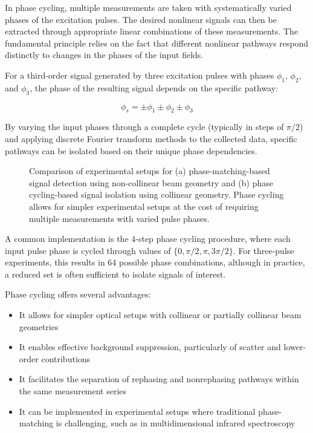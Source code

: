 \noindent In phase cycling, multiple measurements are taken with systematically varied phases of the excitation pulses. The desired nonlinear signals can then be extracted through appropriate linear combinations of these measurements. The fundamental principle relies on the fact that different nonlinear pathways respond distinctly to changes in the phases of the input fields.

\noindent For a third-order signal generated by three excitation pulses with phases $\phi_1$, $\phi_2$, and $\phi_3$, the phase of the resulting signal depends on the specific pathway:

\begin{equation}
	\phi_s = \pm\phi_1 \pm\phi_2 \pm\phi_3
	\label{eq:phase_cycling}
\end{equation}

\noindent By varying the input phases through a complete cycle (typically in steps of $\pi/2$) and applying discrete Fourier transform methods to the collected data, specific pathways can be isolated based on their unique phase dependencies.

\begin{figure}[ht]
	\centering
	\caption{Comparison of experimental setups for (a) phase-matching-based signal detection using non-collinear beam geometry and (b) phase cycling-based signal isolation using collinear geometry. Phase cycling allows for simpler experimental setups at the cost of requiring multiple measurements with varied pulse phases.}
	\label{fig:phase_cycling_vs_matching}
\end{figure}

\noindent A common implementation is the 4-step phase cycling procedure, where each input pulse phase is cycled through values of $\{0, \pi/2, \pi, 3\pi/2\}$. For three-pulse experiments, this results in 64 possible phase combinations, although in practice, a reduced set is often sufficient to isolate signals of interest.

\noindent Phase cycling offers several advantages:

\begin{itemize}
	\item It allows for simpler optical setups with collinear or partially collinear beam geometries
	\item It enables effective background suppression, particularly of scatter and lower-order contributions
	\item It facilitates the separation of rephasing and nonrephasing pathways within the same measurement series
	\item It can be implemented in experimental setups where traditional phase-matching is challenging, such as in multidimensional infrared spectroscopy
\end{itemize}


